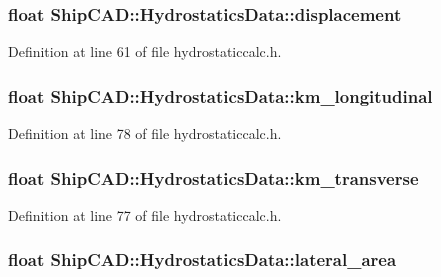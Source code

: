 \hypertarget{structShipCAD_1_1HydrostaticsData_a92d1a8a97eb9b21bad485e40ac4461a0}{
\subsubsection[{displacement}]{\setlength{\rightskip}{0pt plus 5cm}float Ship\-C\-A\-D\-::\-Hydrostatics\-Data\-::displacement}}\label{structShipCAD_1_1HydrostaticsData_a92d1a8a97eb9b21bad485e40ac4461a0}


Definition at line 61 of file hydrostaticcalc.\-h.

\hypertarget{structShipCAD_1_1HydrostaticsData_a0a51e62f7d169fa892eaabc6a1937256}{
\subsubsection[{km\-\_\-longitudinal}]{\setlength{\rightskip}{0pt plus 5cm}float Ship\-C\-A\-D\-::\-Hydrostatics\-Data\-::km\-\_\-longitudinal}}\label{structShipCAD_1_1HydrostaticsData_a0a51e62f7d169fa892eaabc6a1937256}


Definition at line 78 of file hydrostaticcalc.\-h.

\hypertarget{structShipCAD_1_1HydrostaticsData_adbadaf4eafa63f1f10778f4c3e1f61a4}{
\subsubsection[{km\-\_\-transverse}]{\setlength{\rightskip}{0pt plus 5cm}float Ship\-C\-A\-D\-::\-Hydrostatics\-Data\-::km\-\_\-transverse}}\label{structShipCAD_1_1HydrostaticsData_adbadaf4eafa63f1f10778f4c3e1f61a4}


Definition at line 77 of file hydrostaticcalc.\-h.

\hypertarget{structShipCAD_1_1HydrostaticsData_a1ba65b28e4351a4d97bc64cd11ddab90}{
\subsubsection[{lateral\-\_\-area}]{\setlength{\rightskip}{0pt plus 5cm}float Ship\-C\-A\-D\-::\-Hydrostatics\-Data\-::lateral\-\_\-area}}\label{structShipCAD_1_1HydrostaticsData_a1ba65b28e4351a4d97bc64cd11ddab90}


